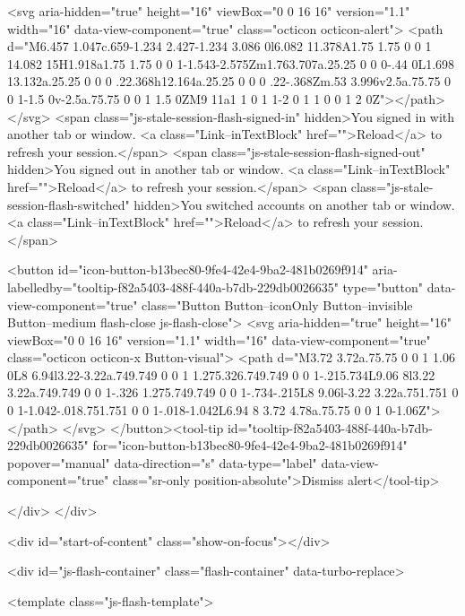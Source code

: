         <svg aria-hidden="true" height="16" viewBox="0 0 16 16" version="1.1" width="16" data-view-component="true" class="octicon octicon-alert">
    <path d="M6.457 1.047c.659-1.234 2.427-1.234 3.086 0l6.082 11.378A1.75 1.75 0 0 1 14.082 15H1.918a1.75 1.75 0 0 1-1.543-2.575Zm1.763.707a.25.25 0 0 0-.44 0L1.698 13.132a.25.25 0 0 0 .22.368h12.164a.25.25 0 0 0 .22-.368Zm.53 3.996v2.5a.75.75 0 0 1-1.5 0v-2.5a.75.75 0 0 1 1.5 0ZM9 11a1 1 0 1 1-2 0 1 1 0 0 1 2 0Z"></path>
</svg>
        <span class="js-stale-session-flash-signed-in" hidden>You signed in with another tab or window. <a class="Link--inTextBlock" href="">Reload</a> to refresh your session.</span>
        <span class="js-stale-session-flash-signed-out" hidden>You signed out in another tab or window. <a class="Link--inTextBlock" href="">Reload</a> to refresh your session.</span>
        <span class="js-stale-session-flash-switched" hidden>You switched accounts on another tab or window. <a class="Link--inTextBlock" href="">Reload</a> to refresh your session.</span>

    <button id="icon-button-b13bec80-9fe4-42e4-9ba2-481b0269f914" aria-labelledby="tooltip-f82a5403-488f-440a-b7db-229db0026635" type="button" data-view-component="true" class="Button Button--iconOnly Button--invisible Button--medium flash-close js-flash-close">  <svg aria-hidden="true" height="16" viewBox="0 0 16 16" version="1.1" width="16" data-view-component="true" class="octicon octicon-x Button-visual">
    <path d="M3.72 3.72a.75.75 0 0 1 1.06 0L8 6.94l3.22-3.22a.749.749 0 0 1 1.275.326.749.749 0 0 1-.215.734L9.06 8l3.22 3.22a.749.749 0 0 1-.326 1.275.749.749 0 0 1-.734-.215L8 9.06l-3.22 3.22a.751.751 0 0 1-1.042-.018.751.751 0 0 1-.018-1.042L6.94 8 3.72 4.78a.75.75 0 0 1 0-1.06Z"></path>
</svg>
</button><tool-tip id="tooltip-f82a5403-488f-440a-b7db-229db0026635" for="icon-button-b13bec80-9fe4-42e4-9ba2-481b0269f914" popover="manual" data-direction="s" data-type="label" data-view-component="true" class="sr-only position-absolute">Dismiss alert</tool-tip>


  
</div>
    </div>

  <div id="start-of-content" class="show-on-focus"></div>








    <div id="js-flash-container" class="flash-container" data-turbo-replace>




  <template class="js-flash-template">
    
